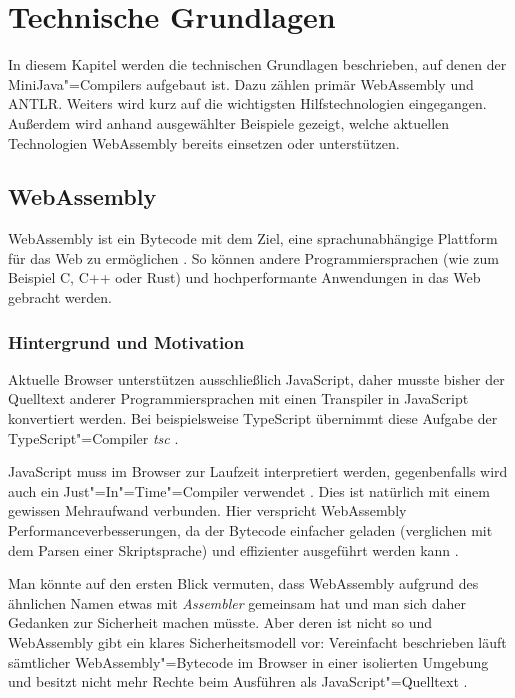 \chapter{Technische Grundlagen}
\label{cha:Technische-Grundlagen}

In diesem Kapitel werden die technischen Grundlagen beschrieben, auf denen der MiniJava"=Compilers aufgebaut ist. Dazu zählen primär WebAssembly und ANTLR. Weiters wird kurz auf die wichtigsten Hilfstechnologien eingegangen. Außerdem wird anhand ausgewählter Beispiele gezeigt, welche aktuellen Technologien WebAssembly bereits einsetzen oder unterstützen.

\section{WebAssembly}
WebAssembly ist ein Bytecode mit dem Ziel, eine sprachunabhängige Plattform für das Web zu ermöglichen \cite{WebAssemblyWebsite} \cite{WebAssemblySpecification}. So können andere Programmiersprachen (wie zum Beispiel C, C++ oder Rust) und hochperformante Anwendungen in das Web gebracht werden.

\subsection{Hintergrund und Motivation}
Aktuelle Browser unterstützen ausschließlich JavaScript, daher musste bisher der Quelltext anderer Programmiersprachen mit einen Transpiler in JavaScript konvertiert werden. Bei beispielsweise TypeScript übernimmt diese Aufgabe der TypeScript"=Compiler \emph{tsc} \cite{TypeScript}.

JavaScript muss im Browser zur Laufzeit interpretiert werden, gegenbenfalls wird auch ein Just"=In"=Time"=Compiler verwendet \cite{MDNJavaScript}. Dies ist natürlich mit einem gewissen Mehraufwand verbunden. Hier verspricht WebAssembly Performanceverbesserungen, da der Bytecode einfacher geladen (verglichen mit dem Parsen einer Skriptsprache) und effizienter ausgeführt werden kann \cite{WebAssemblySpecification}.

Man könnte auf den ersten Blick vermuten, dass WebAssembly aufgrund des ähnlichen Namen etwas mit \emph{Assembler} gemeinsam hat und man sich daher Gedanken zur Sicherheit machen müsste. Aber deren ist nicht so und WebAssembly gibt ein klares Sicherheitsmodell vor: Vereinfacht beschrieben läuft sämtlicher WebAssembly"=Bytecode im Browser in einer isolierten Umgebung und besitzt nicht mehr Rechte beim Ausführen als JavaScript"=Quelltext \cite{WebAssemblyWebsite} \cite{WebAssemblyW3CPressStandard}.

